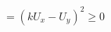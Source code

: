 \documentclass[border=2.5pt]{standalone}
\begin{document}
$\displaystyle =(kU_x-U_y)^2\ge0$
\end{document}
